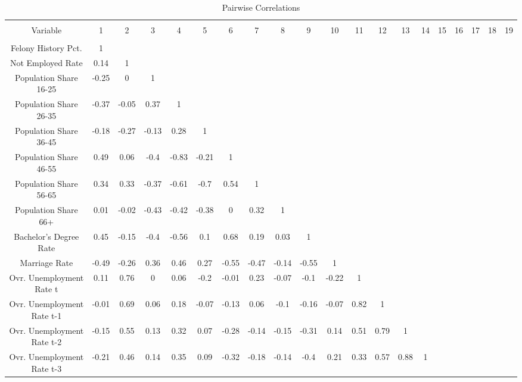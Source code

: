 \documentclass[11pt,]{article}
\begin{document}
\begin{table}[!htbp] \centering 
  \caption{Pairwise Correlations} 
  \label{} 
\small 
\begin{tabular}{@{\extracolsep{0.15pt}} cccccccccccccccccccc} 
\\[-1.8ex]\hline 
\hline \\[-1.8ex] 
Variable & 1 & 2 & 3 & 4 & 5 & 6 & 7 & 8 & 9 & 10 & 11 & 12 & 13 & 14 & 15 & 16 & 17 & 18 & 19 \\ 
\hline \\[-1.8ex] 
Felony History Pct. & 1 &  &  &  &  &  &  &  &  &  &  &  &  &  &  &  &  &  &  \\ 
Not Employed Rate & 0.14 & 1 &  &  &  &  &  &  &  &  &  &  &  &  &  &  &  &  &  \\ 
Population Share 16-25 & -0.25 & 0 & 1 &  &  &  &  &  &  &  &  &  &  &  &  &  &  &  &  \\ 
Population Share 26-35 & -0.37 & -0.05 & 0.37 & 1 &  &  &  &  &  &  &  &  &  &  &  &  &  &  &  \\ 
Population Share 36-45 & -0.18 & -0.27 & -0.13 & 0.28 & 1 &  &  &  &  &  &  &  &  &  &  &  &  &  &  \\ 
Population Share 46-55 & 0.49 & 0.06 & -0.4 & -0.83 & -0.21 & 1 &  &  &  &  &  &  &  &  &  &  &  &  &  \\ 
Population Share 56-65 & 0.34 & 0.33 & -0.37 & -0.61 & -0.7 & 0.54 & 1 &  &  &  &  &  &  &  &  &  &  &  &  \\ 
Population Share 66+ & 0.01 & -0.02 & -0.43 & -0.42 & -0.38 & 0 & 0.32 & 1 &  &  &  &  &  &  &  &  &  &  &  \\ 
Bachelor's Degree Rate & 0.45 & -0.15 & -0.4 & -0.56 & 0.1 & 0.68 & 0.19 & 0.03 & 1 &  &  &  &  &  &  &  &  &  &  \\ 
Marriage Rate & -0.49 & -0.26 & 0.36 & 0.46 & 0.27 & -0.55 & -0.47 & -0.14 & -0.55 & 1 &  &  &  &  &  &  &  &  &  \\ 
Ovr. Unemployment Rate t & 0.11 & 0.76 & 0 & 0.06 & -0.2 & -0.01 & 0.23 & -0.07 & -0.1 & -0.22 & 1 &  &  &  &  &  &  &  &  \\ 
Ovr. Unemployment Rate t-1 & -0.01 & 0.69 & 0.06 & 0.18 & -0.07 & -0.13 & 0.06 & -0.1 & -0.16 & -0.07 & 0.82 & 1 &  &  &  &  &  &  &  \\ 
Ovr. Unemployment Rate t-2 & -0.15 & 0.55 & 0.13 & 0.32 & 0.07 & -0.28 & -0.14 & -0.15 & -0.31 & 0.14 & 0.51 & 0.79 & 1 &  &  &  &  &  &  \\ 
Ovr. Unemployment Rate t-3 & -0.21 & 0.46 & 0.14 & 0.35 & 0.09 & -0.32 & -0.18 & -0.14 & -0.4 & 0.21 & 0.33 & 0.57 & 0.88 & 1 &  &  &  &  &  \\ 

\end{tabular}
\end{table}
\end{document}
